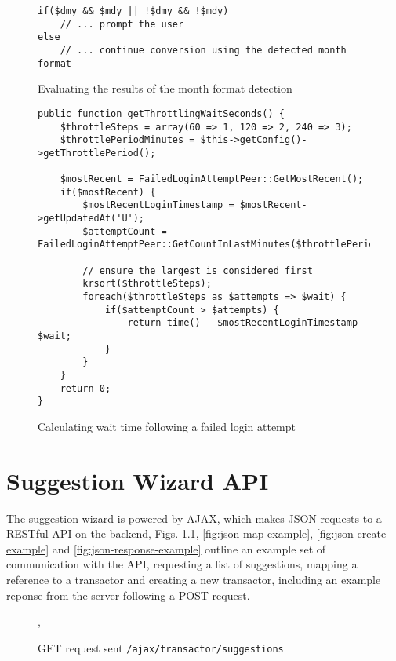 \begin{appendices}
\begin{figure}
\lstset{style=phpcolor}
\begin{lstlisting}
if($dmy && $mdy || !$dmy && !$mdy)
    // ... prompt the user
else
    // ... continue conversion using the detected month format
\end{lstlisting}
\caption{Evaluating the results of the month format detection}
\end{figure}

\begin{figure}
\centering
\begin{lstlisting}[style=phpcolor]
public function getThrottlingWaitSeconds() {
	$throttleSteps = array(60 => 1, 120 => 2, 240 => 3);
	$throttlePeriodMinutes = $this->getConfig()->getThrottlePeriod();
	
	$mostRecent = FailedLoginAttemptPeer::GetMostRecent();		
	if($mostRecent) {
		$mostRecentLoginTimestamp = $mostRecent->getUpdatedAt('U');
		$attemptCount = FailedLoginAttemptPeer::GetCountInLastMinutes($throttlePeriodMinutes);
		
		// ensure the largest is considered first
		krsort($throttleSteps);
		foreach($throttleSteps as $attempts => $wait) {
			if($attemptCount > $attempts) {
				return time() - $mostRecentLoginTimestamp - $wait;
			}
		}
	}
	return 0;
}
\end{lstlisting}
\caption{Calculating wait time following a failed login attempt}
\label{fig:getThrottlingWaitSeconds}
\end{figure}

\chapter{Suggestion Wizard API} \label{app:suggestionwizard-api}

The suggestion wizard is powered by AJAX, which makes JSON requests to a RESTful API on the backend, Figs. \ref{fig:json-post-example}, \ref{fig:json-map-example}, \ref{fig:json-create-example}  and \ref{fig:json-response-example} outline an example set of communication with the API, requesting a list of suggestions, mapping a reference to a transactor and creating a new transactor, including an example reponse from the server following a POST request.

\begin{figure}
    
    \caption{GET request sent \lstinline{/ajax/transactor/suggestions}}
    \label{fig:json-post-example},
\end{figure}


\end{appendices}
